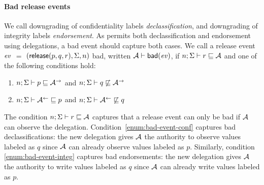 \paragraph{Bad release events}
We call downgrading of confidentiality labels \emph{declassification}, and downgrading of integrity labels \emph{endorsement}. As \lang{} permits both declassification and endorsement using delegations, a bad event should capture both cases. We call a release event $\mathit{ev}$ $=$ $(\mathsf{release}(p, q, r), \Sigma, n)$ bad, written $\mathcal{A} \vdash \mathsf{bad}(\mathit{ev})$, if $n; \Sigma \vdash r \sqsubseteq \mathcal{A}$ and one of the following conditions hold:
\begin{enumerate}
    \item \label{enum:bad-event-conf} $n; \Sigma \vdash p \sqsubseteq \mathcal{A}^{\rightarrow}$ and $n; \Sigma \vdash q \not\sqsubseteq \mathcal{A}^{\rightarrow}$
    \item \label{enum:bad-event-integ} $n; \Sigma \vdash \mathcal{A}^{\leftarrow} \sqsubseteq p$ and $n; \Sigma \vdash \mathcal{A}^{\leftarrow} \not\sqsubseteq q$
\end{enumerate}
The condition $n; \Sigma \vdash r \sqsubseteq \mathcal{A}$ captures that a release event can only be bad if $\mathcal{A}$ can observe the delegation. Condition~\ref{enum:bad-event-conf} captures bad declassifications: the new delegation gives $\mathcal{A}$ the authority to observe values labeled as $q$ since $\mathcal{A}$ can already observe values labeled as $p$. Similarly, condition \ref{enum:bad-event-integ} captures bad endorsements: the new delegation gives $\mathcal{A}$ the authority to write values labeled as $q$ since $\mathcal{A}$ can already write values labeled as $p$.


